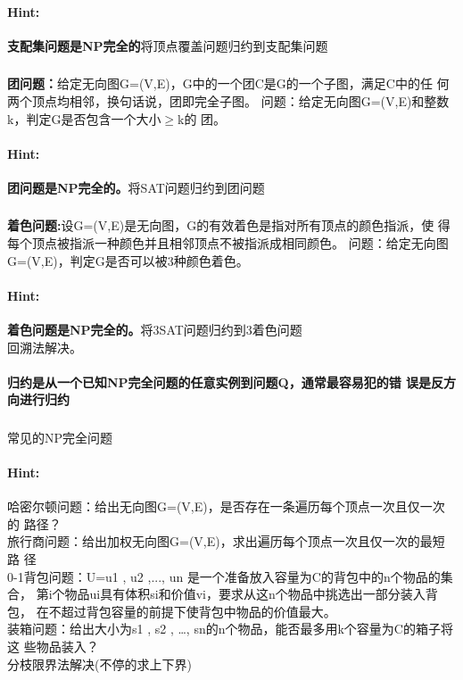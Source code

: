 \documentclass{article}
\begin{document}
     \paragraph{Hint:}\textbf{支配集问题是NP完全的}将顶点覆盖问题归约到支配集问题
     
     
     \subsubsection{}\textbf{团问题：}给定无向图G=(V,E)，G中的一个团C是G的一个子图，满足C中的任
何两个顶点均相邻，换句话说，团即完全子图。
问题：给定无向图G=(V,E)和整数k，判定G是否包含一个大小$\geq$k的
团。
     \paragraph{Hint:}\textbf{团问题是NP完全的。}将SAT问题归约到团问题
     
     \subsubsection{}\textbf{着色问题:}设G=(V,E)是无向图，G的有效着色是指对所有顶点的颜色指派，使
得每个顶点被指派一种颜色并且相邻顶点不被指派成相同颜色。
问题：给定无向图G=(V,E)，判定G是否可以被3种颜色着色。
     \paragraph{Hint:}\textbf{着色问题是NP完全的。}将3SAT问题归约到3着色问题\\
     回溯法解决。\\
     
     
     \paragraph{归约是从一个已知NP完全问题的任意实例到问题Q，通常最容易犯的错
误是反方向进行归约}

     \subsubsection{}常见的NP完全问题
     \paragraph{Hint:}哈密尔顿问题：给出无向图G=(V,E)，是否存在一条遍历每个顶点一次且仅一次的
路径？\\
旅行商问题：给出加权无向图G=(V,E)，求出遍历每个顶点一次且仅一次的最短路
径\\
0-1背包问题：U={u1
, u2
,..., un
}是一个准备放入容量为C的背包中的n个物品的集合，
第i个物品ui具有体积si和价值vi，要求从这n个物品中挑选出一部分装入背包，
在不超过背包容量的前提下使背包中物品的价值最大。\\
装箱问题：给出大小为s1
, s2
, …, sn的n个物品，能否最多用k个容量为C的箱子将这
些物品装入？\\
\indent 分枝限界法解决(不停的求上下界)\\
\end{document}
